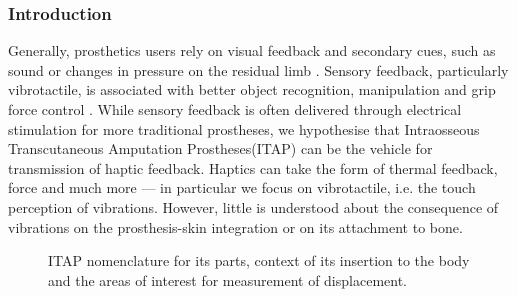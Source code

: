 \subsubsection*{Introduction}
Generally, prosthetics users rely on visual feedback and secondary cues, such as sound or changes in pressure on the residual limb \cite{schofield_applications_2014}.
Sensory feedback, particularly vibrotactile, is associated with better object recognition, manipulation and grip force control \cite{schiefer_artificial_2018}\cite{rosenbaum-chou_development_2016}.
While sensory feedback is often delivered through electrical stimulation for more traditional prostheses, we hypothesise that Intraosseous Transcutaneous Amputation Prostheses(ITAP) can be the vehicle for transmission of haptic feedback.
Haptics can take the form of thermal feedback, force and much more --- in particular we focus on vibrotactile, i.e. the touch perception of vibrations.
However, little is understood about the consequence of vibrations on the prosthesis-skin integration or on its attachment to bone.

\begin{figure}[h]\centering
    \caption{ITAP nomenclature for its parts, context of its insertion to the body and the areas of interest for measurement of displacement.}
    \label{fig:ITAP}
\end{figure}
